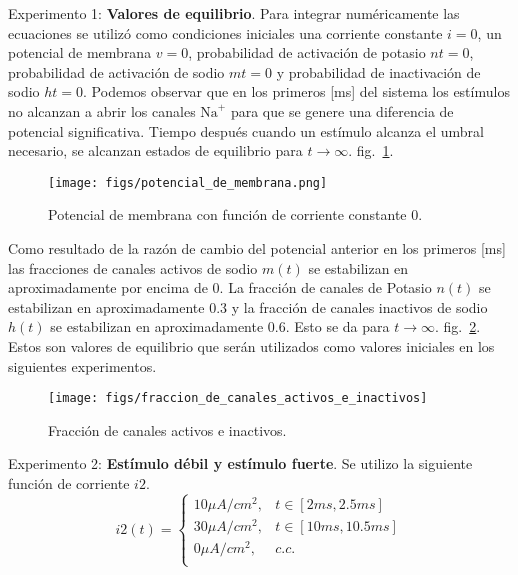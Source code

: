 \documentclass[aps,prl,twocolumn,groupedaddress]{revtex4-2}
\begin{document}
Experimento 1: \textbf{Valores de equilibrio}. Para integrar numéricamente las ecuaciones se utilizó como condiciones iniciales una corriente constante $i=0$, un potencial de membrana $v=0$, probabilidad de activación de potasio $nt=0$, probabilidad de activación de sodio $mt=0$ y probabilidad de inactivación de sodio $ht =0$. Podemos observar que en los primeros [ms] del sistema los estímulos no alcanzan a abrir los canales $\mathrm{Na}^+$ para que se genere una diferencia de potencial significativa. Tiempo después cuando un estímulo alcanza el umbral necesario, se alcanzan estados de equilibrio para ${t \to \infty}$. fig.~\ref{fig1}.\\

\begin{figure}[h!]
\centering
\texttt{[image: figs/potencial\_de\_membrana.png]}
\caption{Potencial de membrana con función de corriente constante 0. \label{fig1}}
\end{figure}


Como resultado de la razón de cambio del potencial anterior en los primeros [ms] las fracciones de canales activos de sodio $m(t)$ se estabilizan en aproximadamente por encima de 0. La fracción de canales de Potasio $n(t)$ se estabilizan en aproximadamente 0.3 y la fracción de canales inactivos de sodio $h(t)$ se estabilizan en aproximadamente 0.6. Esto se da para ${t \to \infty}$. fig.~\ref{fig2}. Estos son valores de equilibrio que serán utilizados como valores iniciales en los siguientes experimentos.\\


\begin{figure}[h!]
\centering
\texttt{[image: figs/fraccion\_de\_canales\_activos\_e\_inactivos]}
\caption{Fracción de canales activos e inactivos. \label{fig2}}
\end{figure}


Experimento 2: \textbf{Estímulo débil y estímulo fuerte}. Se utilizo la siguiente función de corriente $i2$.\\
$$
i2(t) = \left\{
\begin{array}{ll}
10 \mu A/cm^2, & t\in [2ms, 2.5ms] \\
30 \mu A/cm^2, & t\in [10ms, 10.5ms] \\
0 \mu A/cm^2, & c.c. \\
\end{array}
\right.
$$
 
\end{document}
